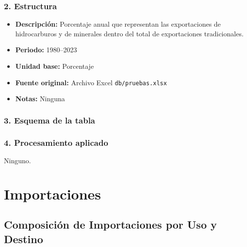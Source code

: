 \documentclass[12pt,a4paper]{article}
\begin{document}
\subsubsection*{2. Estructura}
\begin{itemize}
  \item \textbf{Descripción:} Porcentaje anual que representan las exportaciones de hidrocarburos y de minerales dentro del total de exportaciones tradicionales.
  \item \textbf{Periodo:} 1980--2023
  \item \textbf{Unidad base:} Porcentaje
  \item \textbf{Fuente original:} Archivo Excel \texttt{db/pruebas.xlsx}
  \item \textbf{Notas:} Ninguna
\end{itemize}

\subsubsection*{3. Esquema de la tabla}

\subsubsection*{4. Procesamiento aplicado}
Ninguno.

\newpage
\section{Importaciones}

\subsection{Composición de Importaciones por Uso y Destino}
\end{document}
